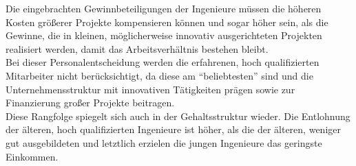 %
Die eingebrachten Gewinnbeteiligungen der Ingenieure müssen die höheren Kosten größerer Projekte kompensieren können und sogar höher sein, als die Gewinne, die in kleinen, möglicherweise innovativ ausgerichteten Projekten realisiert werden, damit das Arbeitsverhältnis bestehen bleibt. \\
%
Bei dieser Personalentscheidung werden die erfahrenen, hoch qualifizierten Mitarbeiter nicht berücksichtigt, da diese am "`beliebtesten"' sind und die Unternehmensstruktur mit innovativen Tätigkeiten prägen sowie zur Finanzierung großer Projekte beitragen.\\
%
Diese Rangfolge spiegelt sich auch in der Gehaltsstruktur wieder. Die Entlohnung der älteren, hoch qualifizierten Ingenieure ist höher, als die der älteren, weniger gut ausgebildeten und letztlich erzielen die jungen Ingenieure das geringste Einkommen.
%
